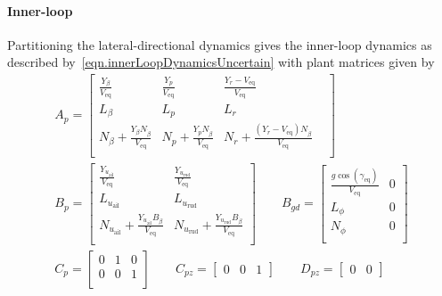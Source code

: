 \paragraph{Inner-loop}
Partitioning the lateral-directional dynamics gives the inner-loop dynamics as described by\ \eqref{eqn.innerLoopDynamicsUncertain} with plant matrices given by
\begin{equation*}
  \begin{gathered}
    A_{p}
    =
    \begin{bmatrix}
      \frac{Y_{\beta}}{V_{\text{eq}}} & \frac{Y_{p}}{V_{\text{eq}}} & \frac{Y_{r}-V_{\text{eq}}}{V_{\text{eq}}} & \\
      L_{\beta} & L_{p} & L_{r} \\
      N_{\beta}+\frac{Y_{\beta}N_{\dot{\beta}}}{V_{\text{eq}}} & N_{p}+\frac{Y_{p}N_{\dot{\beta}}}{V_{\text{eq}}} & N_{r}+\frac{(Y_{r}-V_{\text{eq}})N_{\dot{\beta}}}{V_{\text{eq}}} \\
    \end{bmatrix} \\[8pt]
    B_{p} =
    \begin{bmatrix}
      \frac{Y_{u_{\text{ail}}}}{V_{\text{eq}}} & \frac{Y_{u_{\text{rud}}}}{V_{\text{eq}}} \\
      L_{u_{\text{ail}}} & L_{u_{\text{rud}}} \\
      N_{u_{\text{ail}}}+\frac{Y_{u_{\text{ail}}}B_{\dot{\beta}}}{V_{\text{eq}}} & N_{u_{\text{rud}}}+\frac{Y_{u_{\text{rud}}}B_{\dot{\beta}}}{V_{\text{eq}}} \\
    \end{bmatrix}
    \qquad
    B_{gd} =
    \begin{bmatrix}
      \frac{g\cos(\gamma_{\text{eq}})}{V_{\text{eq}}} & 0 \\
      L_{\phi} & 0 \\
      N_{\phi} & 0 \\
    \end{bmatrix} \\[8pt]
    C_{p} =
    \begin{bmatrix}
      0 & 1 & 0 \\
      0 & 0 & 1 \\
    \end{bmatrix}
    \qquad
    C_{pz} =
    \begin{bmatrix}
      0 & 0 & 1
    \end{bmatrix}
    \qquad
    D_{pz} =
    \begin{bmatrix}
      0 & 0
    \end{bmatrix}
  \end{gathered}
\end{equation*}
